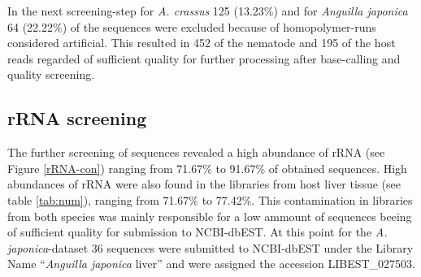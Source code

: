 In the next screening-step for \textit{A. crassus} 125 (13.23\%) and
for \textit{Anguilla japonica} 64 (22.22\%) of the sequences were
excluded because of homopolymer-runs considered artificial. This
resulted in 452 of the nematode and 195 of the host reads regarded of
sufficient quality for further processing after base-calling and
quality screening.

\subsection{rRNA screening}
\label{rRNA-pil}

The further screening of sequences revealed a high abundance of rRNA
(see Figure \ref{rRNA-con}) ranging from 71.67\% to 91.67\% of
obtained sequences.  High abundances of rRNA were also found in the
libraries from host liver tissue (see table \ref{tab:num}), ranging
from 71.67\% to 77.42\%. This contamination in libraries from both
species was mainly responsible for a low ammount of sequences beeing
of sufficient quality for submission to NCBI-dbEST. At this point for
the \textit{A. japonica}-dataset 36 sequences were submitted to
NCBI-dbEST under the Library Name ``\textit{Anguilla japonica} liver''
and were assigned the accession LIBEST\_027503.


